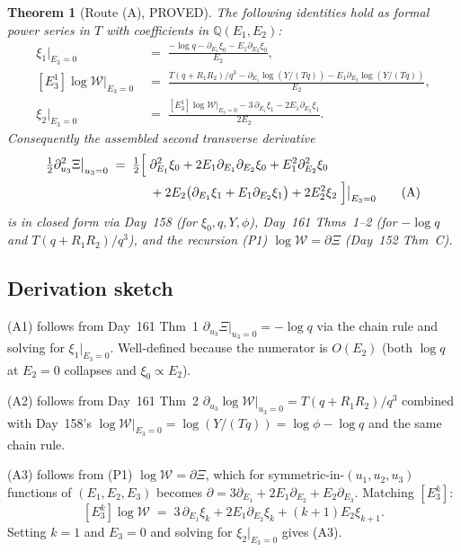 \documentclass[11pt]{amsart}
\newtheorem{theorem}{Theorem}
\newcommand{\W}{\mathcal W}
\newcommand{\uu}{(u_1, u_2, u_3)}
\begin{document}
\begin{theorem}[Route (A), PROVED]
\label{thm:routeA}
The following identities hold as formal power series in $T$ with coefficients
in $\mathbb Q(E_1, E_2)$:
\begin{align}
\xi_1\big|_{E_3=0} &\;=\; \frac{-\log q - \partial_{E_1}\xi_0 - E_1 \partial_{E_2}\xi_0}{E_2}, \tag{A1} \\[4pt]
[E_3^1] \log \W\big|_{E_3=0} &\;=\; \frac{T(q + R_1 R_2)/q^3 - \partial_{E_1}\log(Y/(Tq)) - E_1 \partial_{E_2}\log(Y/(Tq))}{E_2}, \tag{A2} \\[4pt]
\xi_2\big|_{E_3=0} &\;=\; \frac{[E_3^1]\log \W\big|_{E_3=0} - 3\, \partial_{E_1}\xi_1 - 2 E_1 \partial_{E_2}\xi_1}{2 E_2}. \tag{A3}
\end{align}
Consequently the assembled second transverse derivative
\begin{align}
\tfrac{1}{2}\partial_{u_3}^2 \Xi\big|_{u_3=0} \;=\; \tfrac{1}{2}\Bigl[\;
&\partial_{E_1}^2 \xi_0 + 2 E_1 \partial_{E_1}\partial_{E_2}\xi_0 + E_1^2 \partial_{E_2}^2 \xi_0 \notag \\
&+ 2 E_2\bigl(\partial_{E_1}\xi_1 + E_1 \partial_{E_2}\xi_1\bigr) + 2 E_2^2 \xi_2\; \Bigr]\big|_{E_3 = 0}
\tag{A}
\end{align}
is in closed form via Day~158 (for $\xi_0, q, Y, \phi$), Day~161 Thms~1--2
(for $-\log q$ and $T(q + R_1 R_2)/q^3$), and the recursion (P1)
$\log \W = \partial \Xi$ (Day~152 Thm~C).
\end{theorem}

\subsection{Derivation sketch}

(A1) follows from Day~161 Thm~1 $\partial_{u_3}\Xi|_{u_3=0} = -\log q$
via the chain rule and solving for $\xi_1|_{E_3=0}$. Well-defined because
the numerator is $O(E_2)$ (both $\log q$ at $E_2=0$ collapses and
$\xi_0 \propto E_2$).

(A2) follows from Day~161 Thm~2 $\partial_{u_3}\log \W|_{u_3=0} =
T(q+R_1R_2)/q^3$ combined with Day~158's $\log \W|_{E_3=0} = \log(Y/(Tq)) =
\log \phi - \log q$ and the same chain rule.

(A3) follows from (P1) $\log \W = \partial \Xi$, which for symmetric-in-$\uu$
functions of $(E_1, E_2, E_3)$ becomes $\partial = 3 \partial_{E_1} +
2 E_1 \partial_{E_2} + E_2 \partial_{E_3}$. Matching $[E_3^k]$:
\[
[E_3^k] \log \W \;=\; 3\, \partial_{E_1}\xi_k + 2 E_1 \partial_{E_2}\xi_k + (k+1) E_2 \xi_{k+1}.
\]
Setting $k = 1$ and $E_3 = 0$ and solving for $\xi_2|_{E_3=0}$ gives (A3).
\end{document}
